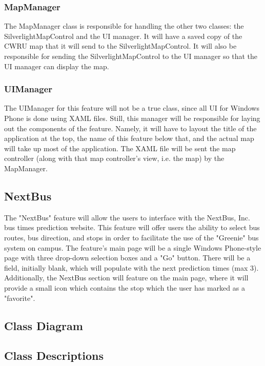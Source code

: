 \documentclass[pdftex,12pt,letter]{article}
\begin{document}
\subsubsection{MapManager}
The MapManager class is responsible for handling the other two classes: the SilverlightMapControl and the UI manager. It will have a saved copy of the CWRU map that it will send to the SilverlightMapControl. It will also be responsible for sending the SilverlightMapControl to the UI manager so that the UI manager can display the map.
\subsubsection{UIManager}
The UIManager for this feature will not be a true class, since all UI for Windows Phone is done using XAML files. Still, this manager will be responsible for laying out the components of the feature. Namely, it will have to layout the title of the application at the top, the name of this feature below that, and the actual map will take up most of the application. The XAML file will be sent the map controller (along with that map controller's view, i.e. the map)  by the MapManager.

\subsection{NextBus}
The "NextBus" feature will allow the users to interface with the NextBus, Inc. bus times prediction website. This feature will offer users the ability to select bus routes, bus direction, and stops in order to facilitate the use of the "Greenie" bus system on campus. The feature's main page will be a single Windows Phone-style page with three drop-down selection boxes and a "Go" button. There will be a field, initially blank, which will populate with the next prediction times (max 3). Additionally, the NextBus section will feature on the main page, where it will provide a small icon which contains the stop which the user has marked as a "favorite".
\subsection{Class Diagram}
\subsection{Class Descriptions}
\end{document}
